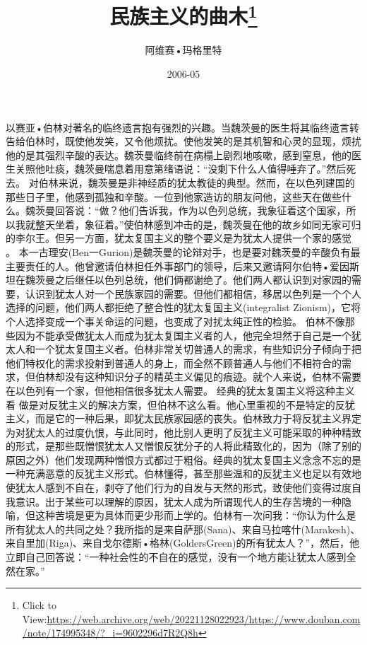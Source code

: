 \documentclass{article}
\title{民族主义的曲木\footnote{Click to View:\url{https://web.archive.org/web/20221128022923/https://www.douban.com/note/174995348/?_i=9602296d7R2Q8h}}}
\author{阿维赛•玛格里特}
\date{2006-05}
\begin{document}

\maketitle


\Large

﻿以赛亚•伯林对著名的临终遗言抱有强烈的兴趣。当魏茨曼的医生将其临终遗言转告给伯林时，既使他发笑，又令他烦扰。使他发笑的是其机智和心灵的显现，烦扰他的是其强烈辛酸的表达。魏茨曼临终前在病榻上剧烈地咳嗽，感到窒息，他的医生关照他吐痰，魏茨曼喘息着用意第绪语说：“没剩下什么人值得唾弃了。”然后死去。
     对伯林来说，魏茨曼是非神经质的犹太教徒的典型。然而，在以色列建国的那些日子里，他感到孤独和辛酸。一位到他家造访的朋友问他，这些天在做些什么。魏茨曼回答说：“做？他们告诉我，作为以色列总统，我象征着这个国家，所以我就整天坐着，象征着。”使伯林感到冲击的是，魏茨曼在他的故乡如同无家可归的李尔王。但另一方面，犹太复国主义的整个要义是为犹太人提供一个家的感觉
\newpage
。
     本一古理安(Ben一Gurion)是魏茨曼的论辩对手，也是要对魏茨曼的辛酸负有最主要责任的人。他曾邀请伯林担任外事部门的领导，后来又邀请阿尔伯特•爱因斯坦在魏茨曼之后继任以色列总统，他们俩都谢绝了。他们两人都认识到对家园的需要，认识到犹太人对一个民族家园的需要。但他们都相信，移居以色列是一个个人选择的问题，他们两人都拒绝了整合性的犹太复国主义(integralist Zionism)，它将个人选择变成一个事关命运的问题，也变成了对扰太纯正性的检验。
     伯林不像那些因为不能承受做犹太人而成为犹太复国主义者的人，他完全坦然于自己是一个犹太人和一个犹太复国主义者。伯林非常关切普通人的需求，有些知识分子倾向于把他们特权化的需求投射到普通人的身上，而全然不顾普通人与他们不相符合的需求，但伯林却没有这种知识分子的精英主义偏见的痕迹。就个人来说，伯林不需要在以色列有一个家，但他相信很多犹太人需要。
     经典的犹太复国主义将这种主义看
\newpage
做是对反犹主义的解决方案，但伯林不这么看。他心里重视的不是特定的反犹主义，而是它的一种后果，即犹太民族家园感的丧失。伯林致力于将反犹主义界定为对犹太人的过度仇恨，与此同时，他比别人更明了反犹主义可能采取的种种精致的形式，是那些既憎恨犹太人又憎恨反犹分子的人将此精致化的，因为（除了别的原因之外）他们发现两种憎恨方式都过于粗俗。经典的犹太复国主义念念不忘的是一种充满恶意的反犹主义形式。伯林懂得，甚至那些温和的反犹主义也足以有效地使犹太人感到不自在，剥夺了他们行为的自发与天然的形式，致使他们变得过度自我意识。出于某些可以理解的原因，犹太人成为所谓现代人的生存苦境的一种隐喻，但这种苦境是更为具体而更少形而上学的。伯林有一次问我：“你认为什么是所有犹太人的共同之处？我所指的是来自萨那(Sana)、来自马拉喀什(Marakesh)、来自里加(Riga)、来自戈尔德斯•格林(GoldersGreen)的所有犹太人？”，然后，他立即自己回答说：“一种社会性的不自在的感觉，没有一个地方能让犹太人感到全然在家。”
\end{document}
